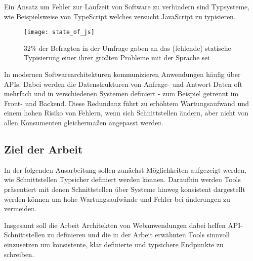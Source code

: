 Ein Ansatz um Fehler zur Laufzeit von Software zu verhindern sind Typsysteme, wie Beispielsweise von TypeScript welches versucht JavaScript zu typisieren.

\begin{figure}[H]
  \centering
  \texttt{[image: state\_of\_js]}
  \caption{32\% der Befragten in der  Umfrage gaben an das (fehlende) statische Typisierung einer ihrer größten Probleme mit der Sprache sei \cite{Greif_Burel_2024}}
\end{figure}

In modernen Softwarearchitekturen kommunizieren Anwendungen häufig über APIs.
Dabei werden die Datenstrukturen von Anfrage- und Antwort Daten oft mehrfach und in verschiedenen Systemen definiert - zum Beispiel getrennt im Front- und Backend.
Diese Redundanz führt zu erhöhtem Wartungsaufwand und einem hohen Risiko von Fehlern, wenn sich Schnittstellen ändern, aber nicht von allen Konsumenten gleichermaßen
angepasst werden.

\subsection{Ziel der Arbeit}

In der folgenden Ausarbeitung sollen zunächst Möglichkeiten aufgezeigt werden, wie Schnittstellen Typsicher definiert werden können.
Daraufhin werden Tools präsentiert mit denen Schnittstellen über Systeme hinweg konsistent dargestellt werden können um hohe Wartungsaufwände und Fehler bei änderungen zu vermeiden.

Insgesamt soll die Arbeit Architekten von Webanwendungen dabei helfen API-Schnittstellen zu definieren und die in der Arbeit erwähnten Tools sinnvoll einzusetzen
um konsistente, klar definierte und typsichere Endpunkte zu schreiben.
